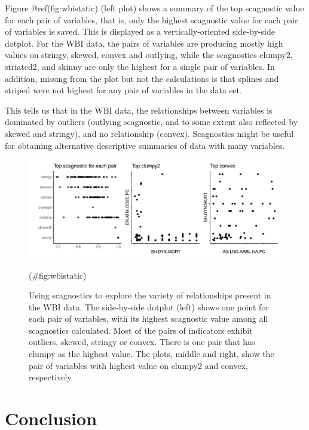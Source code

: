 Figure @ref(fig:wbistatic) (left plot) shows a summary of the top
scagnostic value for each pair of variables, that is, only the highest
scagnostic value for each pair of variables is saved. This is displayed
as a vertically-oriented side-by-side dotplot. For the WBI data, the
pairs of variables are producing mostly high values on stringy, skewed,
convex and outlying, while the scagnostics clumpy2, striated2, and
skinny are only the highest for a single pair of variables. In addition,
missing from the plot but not the calculations is that splines and
striped were not highest for any pair of variables in the data set.

This tells us that in the WBI data, the relationships between variables
is dominated by outliers (outlying scagnostic, and to some extent also
reflected by skewed and stringy), and no relationship (convex).
Scagnostics might be useful for obtaining alternative descriptive
summaries of data with many variables.

\begin{Schunk}
\begin{figure}
\includegraphics[width=1\linewidth]{mason-lee-laa-cook_files/figure-latex/wbistatic-1} \caption[Using scagnostics to explore the variety of relationships present in the WBI data]{Using scagnostics to explore the variety of relationships present in the WBI data. The side-by-side dotplot (left) shows one point for each pair of variables, with its highest scagnostic value among all scagnostics calculated. Most of the pairs of indicators exhibit outliers, skewed, stringy or convex. There is one pair that has clumpy as the highest value. The plots, middle and right, show the pair of variables with highest value on clumpy2 and convex, respectively.}(\#fig:wbistatic)
\end{figure}
\end{Schunk}

\hypertarget{conclusion}{%
\section{Conclusion}\label{conclusion}}

